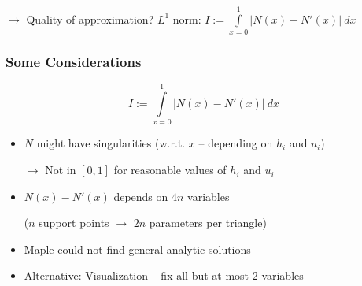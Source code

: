 \documentclass{beamer}
\newcommand{\todo}[1]{
  \textcolor{red}{TODO: #1}
  \note{\textcolor{red}{TODO: #1}}
}
\renewcommand{\todo}[1]{}
\begin{document}
\begin{frame}
\begin{columns}
\begin{column}{.4\textwidth}
\begin{center}
      \end{center}
    \end{column}
  \end{columns}
  
  \begin{center}
    $\rightarrow$ Quality of approximation? $L^1$ norm: $I := \int\limits_{x=0}^1 | N(x) - N'(x) |\ dx$ \todo{Hier wollte der Martin $L^1$-Norm drinstehen haben. Zu wenig Platz}
  \end{center}
\end{frame}

\begin{frame}
  \frametitle{Some Considerations}
  \begin{equation*}
    I := \int\limits_{x=0}^1 | N(x) - N'(x) |\ dx
  \end{equation*}
  \begin{itemize}
  \item $N$ might have singularities (w.r.t. $x$ -- depending on $h_i$ and $u_i$) 

    $\rightarrow$ Not in $[0,1]$ for reasonable values of $h_i$ and $u_i$
  \item $N(x)-N'(x)$ depends on $4n$ variables
    
    ($n$ support points $\rightarrow$ $2n$ parameters per triangle)
  \item Maple could not find general analytic solutions \todo{Rausnehmen?}
  \item Alternative: Visualization -- fix all but at most 2 variables
  \end{itemize}
\end{frame}
\end{document}
